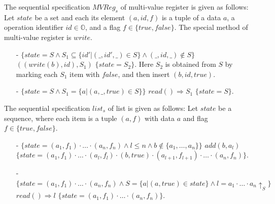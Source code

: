 {\begin{example}
\label{definition:sequential specification of multi-value register}
The sequential specification $\mathit{MVReg}_s$ of multi-value register is given as follows: Let $\mathit{state}$ be a set and each its element $(a,\mathit{id},f)$ is a tuple of a data $a$, a operation identifier $\mathit{id} \in \mathbb{O}$, and a flag $f \in \{ \mathit{true},\mathit{false} \}$. The special method of multi-value register is $\mathit{write}$.
\begin{itemize}
\setlength{\itemsep}{0.5pt}
\item[-] $\{ \mathit{state} = S \wedge S_1 \subseteq \{\mathit{id}' \vert (\_,\mathit{id}',\_) \in S\} \wedge (\_,\mathit{id},\_) \notin S \}$ $((write(b),id),S_1)$ $\{ \mathit{state} = S_2 \}$. Here $S_2$ is obtained from $S$ by marking each $S_1$ item with $\mathit{false}$, and then insert $(b,id,\mathit{true})$.
\item[-] $\{ \mathit{state} = S \wedge S_1 = \{ a \vert (a,\_,\mathit{true}) \in S \} \}$ $read() \Rightarrow S_1$ $\{ \mathit{state} = S \}$.
\end{itemize}
\end{example}


\begin{example}
\label{definition:sequential specification of list with add-after interface}
The sequential specification $\mathit{list}_s$ of list is given as follows: Let $\mathit{state}$ be a sequence, where each item is a tuple $(a,f)$ with data $a$ and flag $f \in \{ \mathit{true},\mathit{false} \}$.
\begin{itemize}
\setlength{\itemsep}{0.5pt}
\item[-] $\{ \mathit{state} = (a_1,f_1) \cdot \ldots \cdot (a_n,f_n) \wedge l \leq n \wedge b \notin \{ a_1, \ldots, a_n \} \}$ $add(b,a_l)$ $\{ \mathit{state} = (a_1,f_1) \cdot \ldots \cdot (a_l,f_l) \cdot (b,\mathit{true}) \cdot (a_{l+1},f_{l+1}) \cdot \ldots \cdot (a_n,f_n) \}$.
\item[-] $\{ \mathit{state} = (a_1,f_1) \cdot \ldots \cdot (a_n,f_n) \wedge S = \{ a \vert (a,\mathit{true}) \in \mathit{state} \} \wedge l = a_1 \cdot \ldots \cdot a_n \uparrow_{S} \}$ $read() \Rightarrow l$ $\{ \mathit{state} = (a_1,f_1) \cdot \ldots \cdot (a_n,f_n) \}$.
\end{itemize}
\end{example}


}
